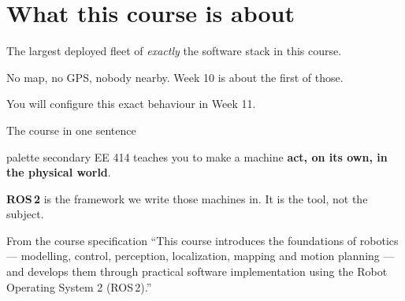 \documentclass[aspectratio=169]{beamer}
\begin{document}
\section{What this course is about}

  {The largest deployed fleet of \emph{exactly} the software stack in this course.}

  {No map, no GPS, nobody nearby. Week 10 is about the first of those.}

  {You will configure this exact behaviour in Week 11.}

%
%

\begin{frame}{The course in one sentence}
  \begin{beamercolorbox}[sep=8pt,center,rounded=true]{palette secondary}
    \large EE 414 teaches you to make a machine \textbf{act, on its own, in the physical world}.
  \end{beamercolorbox}

  \vspace{0.9em}

  \textbf{ROS\,2} is the framework we write those machines in. It is the tool, not the subject.

  \vspace{0.9em}

  \begin{block}{From the course specification}
    \small
    ``This course introduces the foundations of robotics --- modelling, control, perception,
    localization, mapping and motion planning --- and develops them through practical software
    implementation using the Robot Operating System 2 (ROS\,2).''
  \end{block}
\end{frame}
\end{document}
